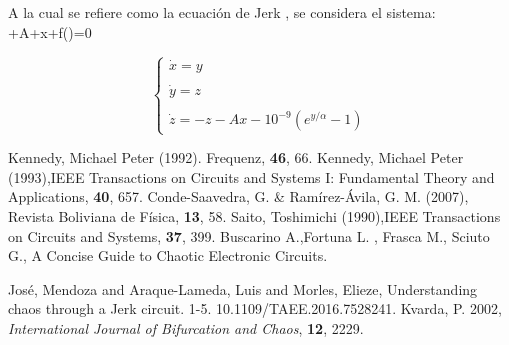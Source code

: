 \documentclass{article}
\begin{document}
A la cual se refiere como la ecuación de Jerk , se considera el sistema:
+A+x+f()=0

\begin{equation}
 \left\lbrace\begin{array}{lcc}
 
 \dot{x} =y \\\\  
   \dot{y} =z\\\\ 
  \dot{z} =-z-Ax- 10^{-9}(e^{y/\alpha}-1)
  
  \end{array}\right. 
\label{eq:one}
\end{equation}


\begin{thebibliography}{X}
 Kennedy, Michael Peter (1992). Frequenz, {\bf 46}, 66.
 Kennedy, Michael Peter (1993),IEEE Transactions on Circuits and Systems I: Fundamental Theory and Applications, {\bf 40}, 657.
 Conde-Saavedra, G. \& Ramírez-Ávila, G. M. (2007), Revista Boliviana de Física, {\bf 13}, 58.
 Saito, Toshimichi (1990),IEEE Transactions on Circuits and Systems, {\bf 37}, 399.
  Buscarino A.,Fortuna L. ,  Frasca M., Sciuto G., A Concise Guide to Chaotic
Electronic Circuits.


  José, Mendoza and Araque-Lameda, Luis and Morles, Elieze, Understanding chaos through a Jerk circuit. 1-5. 10.1109/TAEE.2016.7528241. 
Kvarda, P. 2002, {\it International Journal of Bifurcation and Chaos}, \textbf{12}, 2229.

\end{thebibliography}
\end{document}
